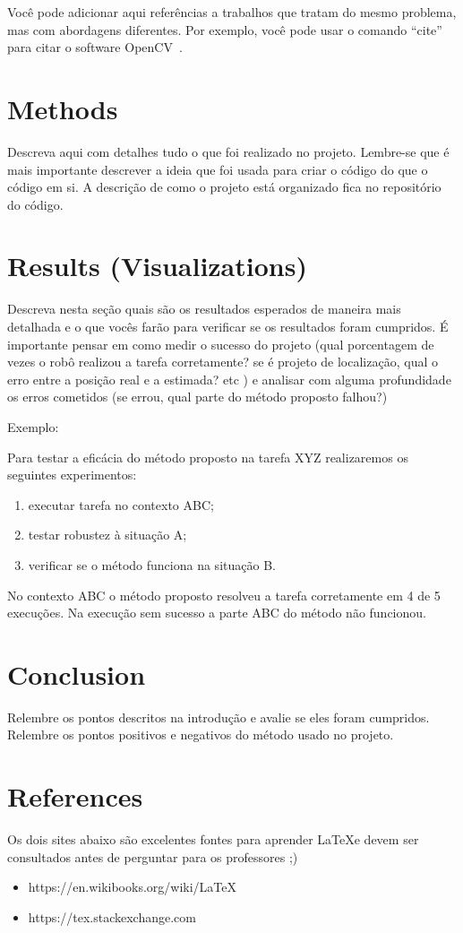 \documentclass[10pt,conference]{IEEEtran}
\begin{document}
Você pode adicionar aqui referências a trabalhos que tratam do mesmo problema, mas com abordagens diferentes. Por exemplo, você pode usar o comando ``cite'' para citar o software OpenCV~\cite{itseez2015opencv}.

\section{Methods }

Descreva aqui com detalhes tudo o que foi realizado no projeto. Lembre-se que é mais importante descrever a ideia que foi usada para criar o código do que o código em si. A descrição de como o projeto está organizado fica no repositório do código. 

\section{Results (Visualizations)}

Descreva nesta seção quais são os resultados esperados de maneira mais detalhada e o que vocês farão para verificar se os resultados foram cumpridos. É importante pensar em como medir o sucesso do projeto (qual porcentagem de vezes o robô realizou a tarefa corretamente? se é projeto de localização, qual o erro entre a posição real e a estimada? etc ) e analisar com alguma profundidade os erros cometidos (se errou, qual parte do método proposto falhou?)

Exemplo:

Para testar a eficácia do método proposto na tarefa XYZ realizaremos os seguintes experimentos:

\begin{enumerate}
\item executar tarefa no contexto ABC;
\item testar robustez à situação A;
\item verificar se o método funciona na situação B.
\end{enumerate}

No contexto ABC o método proposto resolveu a tarefa corretamente em 4 de 5 execuções. Na execução sem sucesso a parte ABC do método não funcionou.

\section{Conclusion}
Relembre os pontos descritos na introdução e avalie se eles foram cumpridos. Relembre os pontos positivos e negativos do método usado no projeto.

\section*{References}

Os dois sites abaixo são excelentes fontes para aprender \LaTeX e devem ser consultados antes de perguntar para os professores ;)

\begin{itemize}
\item https://en.wikibooks.org/wiki/LaTeX
\item https://tex.stackexchange.com
\end{itemize}



\end{document}
